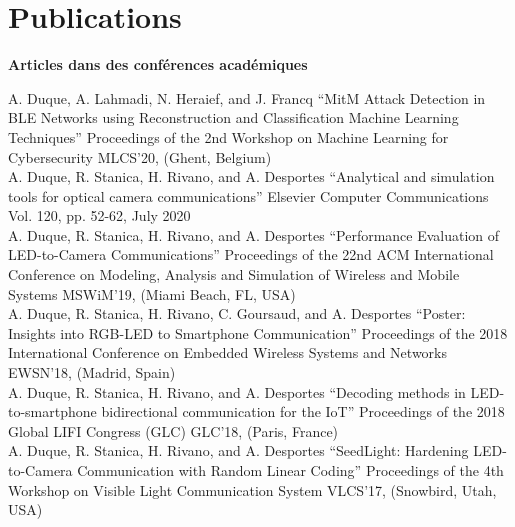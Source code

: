 \documentclass[]{cv-style}          %
\begin{document}
\section{Publications}
 \vspace{-0.2cm}
\large{\textbf{Articles dans des conférences académiques}}

\normalsize
\begin{publist}
\pub
{A. Duque, A. Lahmadi, N. Heraief, and J. Francq}
{“MitM Attack Detection in BLE Networks using Reconstruction and Classification Machine Learning Techniques”}
{Proceedings of the 2nd Workshop on Machine Learning for Cybersecurity}
{MLCS’20, (Ghent, Belgium)}\\
\pub
{A. Duque, R. Stanica, H. Rivano, and A. Desportes}
{“Analytical and simulation tools for optical camera communications”}
{Elsevier Computer Communications}
{Vol. 120, pp. 52-62, July 2020}\\
\pub
{A. Duque, R. Stanica, H. Rivano, and A. Desportes}
{“Performance Evaluation of LED-to-Camera Communications”}
{Proceedings of the 22nd ACM International Conference on Modeling, Analysis and Simulation of Wireless and Mobile Systems}
{MSWiM’19, (Miami Beach, FL, USA)}\\
\pub
{A. Duque, R. Stanica, H. Rivano, C. Goursaud, and A. Desportes}
{“Poster: Insights into RGB-LED to Smartphone Communication”}
{Proceedings of the 2018 International Conference on Embedded Wireless Systems and Networks}
{EWSN’18, (Madrid, Spain)}\\
\pub
{A. Duque, R. Stanica, H. Rivano, and A. Desportes}
{“Decoding methods in LED-to-smartphone bidirectional communication for the IoT”}
{Proceedings of the 2018 Global LIFI Congress (GLC)}
{GLC’18, (Paris, France)}\\
\pub
{A. Duque, R. Stanica, H. Rivano, and A. Desportes}
{“SeedLight: Hardening LED-to-Camera Communication with Random Linear Coding”}
{Proceedings of the 4th Workshop on Visible Light Communication System}
{VLCS’17, (Snowbird, Utah, USA)}\\

\end{publist}
\end{document}
